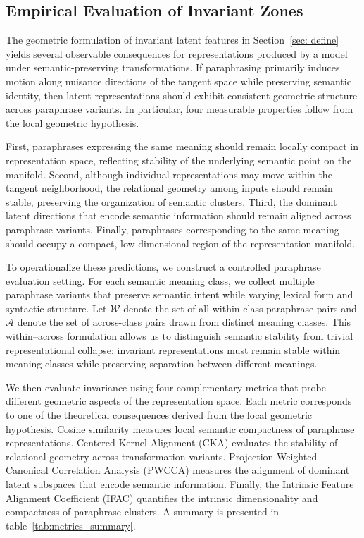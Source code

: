 \subsection{Empirical Evaluation of Invariant Zones}
\label{sec: metric}
The geometric formulation of invariant latent features in Section~\ref{sec: define} yields several observable consequences for representations produced by a model under semantic-preserving transformations. If paraphrasing primarily induces motion along nuisance directions of the tangent space while preserving semantic identity, then latent representations should exhibit consistent geometric structure across paraphrase variants. In particular, four measurable properties follow from the local geometric hypothesis.

First, paraphrases expressing the same meaning should remain locally compact in representation space, reflecting stability of the underlying semantic point on the manifold. Second, although individual representations may move within the tangent neighborhood, the relational geometry among inputs should remain stable, preserving the organization of semantic clusters. Third, the dominant latent directions that encode semantic information should remain aligned across paraphrase variants. Finally, paraphrases corresponding to the same meaning should occupy a compact, low-dimensional region of the representation manifold.

To operationalize these predictions, we construct a controlled paraphrase evaluation setting. For each semantic meaning class, we collect multiple paraphrase variants that preserve semantic intent while varying lexical form and syntactic structure. Let $\mathcal{W}$ denote the set of all within-class paraphrase pairs and $\mathcal{A}$ denote the set of across-class pairs drawn from distinct meaning classes. This within–across formulation allows us to distinguish semantic stability from trivial representational collapse: invariant representations must remain stable within meaning classes while preserving separation between different meanings.

We then evaluate invariance using four complementary metrics that probe different geometric aspects of the representation space. Each metric corresponds to one of the theoretical consequences derived from the local geometric hypothesis. Cosine similarity measures local semantic compactness of paraphrase representations. Centered Kernel Alignment (CKA) evaluates the stability of relational geometry across transformation variants. Projection-Weighted Canonical Correlation Analysis (PWCCA) measures the alignment of dominant latent subspaces that encode semantic information. Finally, the Intrinsic Feature Alignment Coefficient (IFAC) quantifies the intrinsic dimensionality and compactness of paraphrase clusters. A summary is presented in table~\ref{tab:metrics_summary}. 


